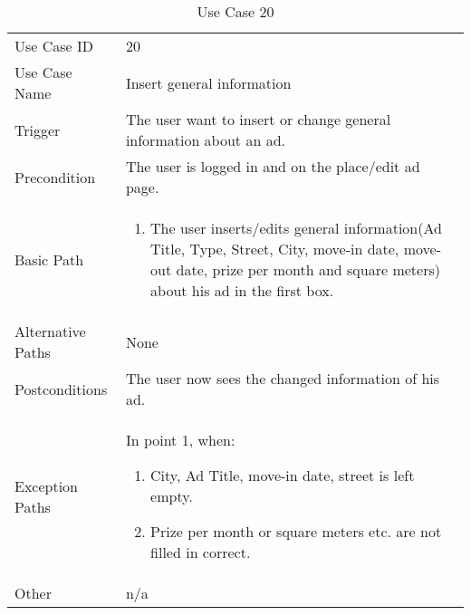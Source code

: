 \begin{table}[H]
\centering
\label{table-use-case-20}
\begin{tabular}{|p{3cm}|p{10cm}}
Use Case ID       & 20                                                      \\
Use Case Name     & Insert general information                            \\
Trigger           & The user want to insert or change general information about
an ad.
\\
Precondition      & The user is logged in and on the place/edit ad page.           
\\
Basic Path        & \begin{enumerate}
\item		The user inserts/edits general information(Ad Title, Type, Street, City,
move-in date, move-out date, prize per month and square meters) about his ad in
the first box.
\end{enumerate} \\
Alternative Paths & None                          \\
Postconditions    & The user now sees the changed information of his ad.	\\
Exception Paths   & In point 1, when: \begin{enumerate}
  \item 		City, Ad Title, move-in date, street is left empty.
  \item			Prize per month or square meters etc. are not filled in correct.
\end{enumerate}			\\
Other             & n/a                                                                                                                                                                                                        
\end{tabular}
\caption{Use Case 20}
\end{table}

